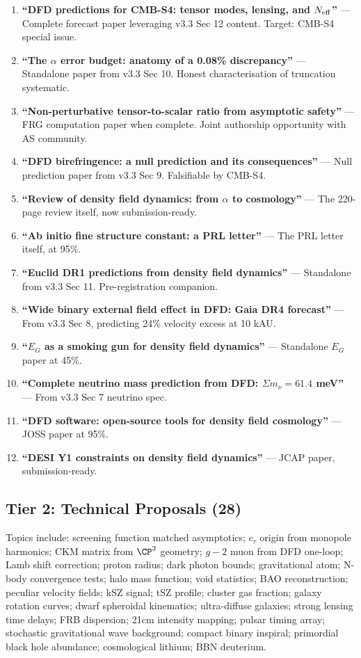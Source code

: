 \documentclass[11pt,a4paper]{article}
\begin{document}
\begin{enumerate}[nosep]
\item \textbf{``DFD predictions for CMB-S4: tensor modes, lensing, and $N_{\rm eff}$''} --- Complete forecast paper leveraging v3.3 Sec 12 content. Target: CMB-S4 special issue.
\item \textbf{``The $\alpha$ error budget: anatomy of a 0.08\% discrepancy''} --- Standalone paper from v3.3 Sec 10. Honest characterisation of truncation systematic.
\item \textbf{``Non-perturbative tensor-to-scalar ratio from asymptotic safety''} --- FRG computation paper when complete. Joint authorship opportunity with AS community.
\item \textbf{``DFD birefringence: a null prediction and its consequences''} --- Null prediction paper from v3.3 Sec 9. Falsifiable by CMB-S4.
\item \textbf{``Review of density field dynamics: from $\alpha$ to cosmology''} --- The 220-page review itself, now submission-ready.
\item \textbf{``Ab initio fine structure constant: a PRL letter''} --- The PRL letter itself, at 95\%.
\item \textbf{``Euclid DR1 predictions from density field dynamics''} --- Standalone from v3.3 Sec 11. Pre-registration companion.
\item \textbf{``Wide binary external field effect in DFD: Gaia DR4 forecast''} --- From v3.3 Sec 8, predicting 24\% velocity excess at 10 kAU.
\item \textbf{``$E_G$ as a smoking gun for density field dynamics''} --- Standalone $E_G$ paper at 45\%.
\item \textbf{``Complete neutrino mass prediction from DFD: $\Sigma m_\nu = 61.4$ meV''} --- From v3.3 Sec 7 neutrino spec.
\item \textbf{``DFD software: open-source tools for density field cosmology''} --- JOSS paper at 95\%.
\item \textbf{``DESI Y1 constraints on density field dynamics''} --- JCAP paper, submission-ready.
\end{enumerate}

\subsection{Tier 2: Technical Proposals (28)}

Topics include: screening function matched asymptotics; $c_\tau$ origin from monopole harmonics; CKM matrix from $\CP^2$ geometry; $g-2$ muon from DFD one-loop; Lamb shift correction; proton radius; dark photon bounds; gravitational atom; N-body convergence tests; halo mass function; void statistics; BAO reconstruction; peculiar velocity fields; kSZ signal; tSZ profile; cluster gas fraction; galaxy rotation curves; dwarf spheroidal kinematics; ultra-diffuse galaxies; strong lensing time delays; FRB dispersion; 21cm intensity mapping; pulsar timing array; stochastic gravitational wave background; compact binary inspiral; primordial black hole abundance; cosmological lithium; BBN deuterium.
\end{document}
